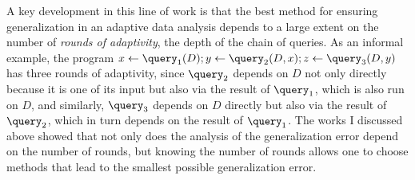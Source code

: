 A key development in this line of work is that the best method for ensuring generalization in an adaptive data analysis depends to a large extent on the number of \emph{rounds of adaptivity}, the depth of the chain of queries. 
As an informal example, the program $x \leftarrow \query_1(D);y \leftarrow \query_2(D,x);z \leftarrow \query_3(D,y)$ has three rounds of adaptivity, since $\query_2$ depends on $D$ not only directly because it is one of its input but also via the result of $\query_1$, 
which is also run on $D$, and similarly, $\query_3$ depends on $D$ directly but also via the result of $\query_2$, which in turn depends on the result of $\query_1$. 
The works I discussed above showed that not only does the analysis of the generalization error depend on the number of rounds, 
but knowing the number of rounds allows one to choose methods that lead to the smallest possible generalization error. 


